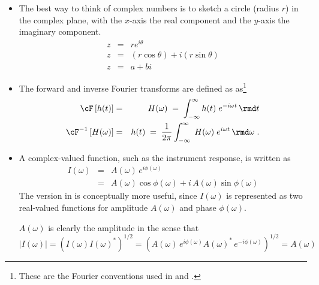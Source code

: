 \documentclass[11pt,titlepage,fleqn]{article}
\newcommand{\fft}{h}
\newcommand{\ffw}{H}
\begin{document}
\begin{itemize}
\item The best way to think of complex numbers is to sketch a circle (radius $r$) in the complex plane, with the $x$-axis the real component and the $y$-axis the imaginary component.
%
\begin{eqnarray*}
z &=& r e^{i\theta}
\\
z &=& (r\cos\theta) + i(r\sin\theta)
\\
z &=& a + bi
\end{eqnarray*}



\item The forward and inverse Fourier transforms are defined as as\footnote{These are the Fourier conventions used in \citet[][p.~109]{DT} and \citet[][Section 6.4.2]{SteinWysession}.}
%
\begin{eqnarray}
\cF \left[ \fft(t) \right] &=& \ffw(\omega)
\;=\; \int_{-\infty}^{\infty} \fft(t) \; e^{-i\omega t} \,\rmd t
\label{fft}
\\
\cF^{-1} \left[ \ffw(\omega) \right] &=& \fft(t) 
\;=\; \frac{1}{2\pi} \int_{-\infty}^{\infty} \; \ffw(\omega) \; e^{i\omega t} \,\rmd\omega 
\label{ifft}
\;.
\end{eqnarray}


\item A complex-valued function, such as the instrument response, is written as
%
\begin{eqnarray}
I(\omega) &=& A(\omega)\,e^{i\phi(\omega)}
\label{Iw}
\\
&=& A(\omega)\cos\phi(\omega) + i\,A(\omega)\sin\phi(\omega)
\end{eqnarray}
%
The version in  is conceptually more useful, since $I(\omega)$ is represented as two real-valued functions for amplitude $A(\omega)$ and phase $\phi(\omega)$.

$A(\omega)$ is clearly the amplitude in the sense that
%
\begin{equation}
|I(\omega)| = \left( I(\omega) I(\omega)^* \right)^{1/2}
= \left( A(\omega)\,e^{i\phi(\omega)} A(\omega)^*\,e^{-i\phi(\omega)} \right)^{1/2}
= A(\omega)
\end{equation}

\end{itemize}

\end{document}
